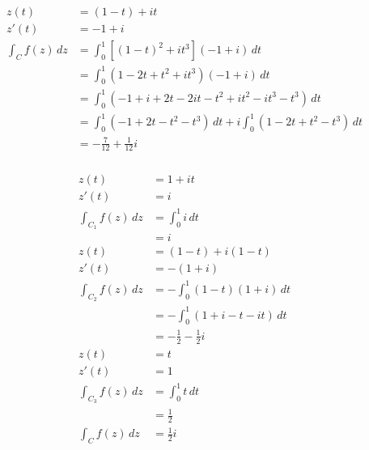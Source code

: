 \documentclass{article}
\begin{document}
\begin{align*}
  z(t)              & = (1 - t) + i t                                                                  \\
  z'(t)             & = -1 + i                                                                         \\
  \int_C f(z) \,d z & = \int_0^1 [(1 - t)^2 + i t^3] (-1 + i) \,d t                                    \\
                    & = \int_0^1 (1 - 2 t + t^2 + i t^3) (-1 + i) \,d t                                \\
                    & = \int_0^1 (-1 + i + 2 t - 2 i t - t^2 + i t^2 - i t^3 - t^3) \,d t              \\
                    & = \int_0^1 (-1 + 2 t - t^2 - t^3) \,d t + i \int_0^1 (1 - 2 t + t^2 - t^3) \,d t \\
                    & = -\frac{7}{12} + \frac{1}{12} i
\end{align*}

\setcounter{subsubsection}{16}
\subsubsection{}

\begin{align*}
  z(t)                  & = 1 + i t                           \\
  z'(t)                 & = i                                 \\
  \int_{C_1} f(z) \,d z & = \int_0^1 i \,d t                  \\
                        & = i                                 \\
  z(t)                  & = (1 - t) + i (1 - t)               \\
  z'(t)                 & = -(1 + i)                          \\
  \int_{C_2} f(z) \,d z & = -\int_0^1 (1 - t) (1 + i) \,d t   \\
                        & = -\int_0^1 (1 + i - t - i t) \,d t \\
                        & = -\frac{1}{2} - \frac{1}{2} i      \\
  z(t)                  & = t                                 \\
  z'(t)                 & = 1                                 \\
  \int_{C_3} f(z) \,d z & = \int_0^1 t \,d t                  \\
                        & = \frac{1}{2}                       \\
  \int_C f(z) \,d z     & = \frac{1}{2} i
\end{align*}
\end{document}
